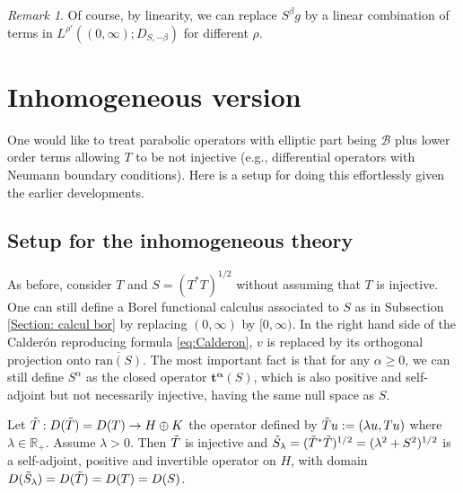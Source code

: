 \documentclass[11pt, letterpaper]{amsart}
\theoremstyle{definition}
\theoremstyle{remark}
\newtheorem{rem}[thm]{Remark}
\numberwithin{equation}{section}
\begin{document}
\begin{rem}
    Of course, by linearity, we can replace $S^\beta g$ by a linear combination of terms  in $L^{\rho'}((0,\infty);D_{S,-\beta})$ for different $\rho$.
\end{rem}


 \section{Inhomogeneous version}\label{sec:Inhomogenous} 
One would like to treat parabolic operators with  elliptic part being ${\mathcal{B}}$ plus lower order terms allowing $T$ to be not injective (e.g., differential operators with Neumann boundary conditions). Here is a setup for doing this effortlessly given the earlier developments.
\subsection{Setup for the inhomogeneous theory}\label{sec:inhomogenouessetup}
As before, consider $T$ and $S=({T}^*{T})^{1/2}$ without assuming that $T$ is injective. One can still define a Borel functional calculus associated to $S$ as in Subsection \ref{Section: calcul bor} by replacing $(0,\infty)$ by $[0,\infty)$. In  the right hand side of the Calder\'on reproducing formula  \eqref{eq:Calderon}, $v$ is replaced by its orthogonal projection onto  $\overline{\mathrm{ran}(S)}$. The most important fact is that for any $\alpha \ge 0$, we can still define $S^\alpha$ as the closed operator $\mathbf{t^{\alpha}}(S)$, which is also positive and self-adjoint but not necessarily injective, having the same null space as $S$.

Let $\Tilde{T}: D(\Tilde{T})= D(T) \rightarrow H\oplus K$ the operator defined by $\Tilde{T}u:=(\lambda u,Tu)$ where $\lambda \in \mathbb{R}_+$. Assume  $\lambda>0$. Then $\Tilde{T}$ is injective and  $\Tilde{S}_\lambda=(\Tilde{T}^*\Tilde{T})^{1/2}=(\lambda^2+S^2)^{{1}/{2}}$  is a  self-adjoint, positive and invertible  operator on $H$, with domain
$D(\Tilde{S}_\lambda)=D(\Tilde{T})=D(T)=D(S)$.   
\end{document}
